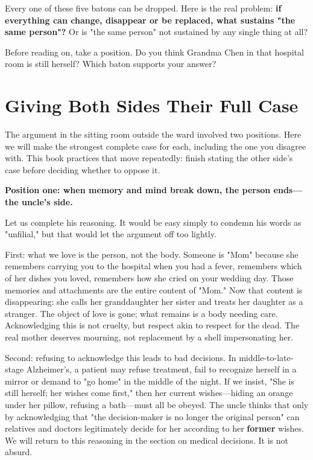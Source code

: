 Every one of these five batons can be dropped. Here is the real problem: \textbf{if everything can change, disappear or be replaced, what sustains "the same person"?} Or is "the same person" not sustained by any single thing at all?

Before reading on, take a position. Do you think Grandma Chen in that hospital room is still herself? Which baton supports your answer?

\section[The Full Case for Both Sides]{Giving Both Sides Their Full Case}
The argument in the sitting room outside the ward involved two positions. Here we will make the strongest complete case for each, including the one you disagree with. This book practices that move repeatedly: finish stating the other side's case before deciding whether to oppose it.

\textbf{Position one: when memory and mind break down, the person ends---the uncle's side.}

Let us complete his reasoning. It would be easy simply to condemn his words as "unfilial," but that would let the argument off too lightly.

First: what we love is the person, not the body. Someone is "Mom" because she remembers carrying you to the hospital when you had a fever, remembers which of her dishes you loved, remembers how she cried on your wedding day. Those memories and attachments are the entire content of "Mom." Now that content is disappearing: she calls her granddaughter her sister and treats her daughter as a stranger. The object of love is gone; what remains is a body needing care. Acknowledging this is not cruelty, but respect akin to respect for the dead. The real mother deserves mourning, not replacement by a shell impersonating her.

Second: refusing to acknowledge this leads to bad decisions. In middle-to-late-stage Alzheimer's, a patient may refuse treatment, fail to recognize herself in a mirror or demand to "go home" in the middle of the night. If we insist, "She is still herself; her wishes come first," then her current wishes---hiding an orange under her pillow, refusing a bath---must all be obeyed. The uncle thinks that only by acknowledging that "the decision-maker is no longer the original person" can relatives and doctors legitimately decide for her according to her \textbf{former} wishes. We will return to this reasoning in the section on medical decisions. It is not absurd.

